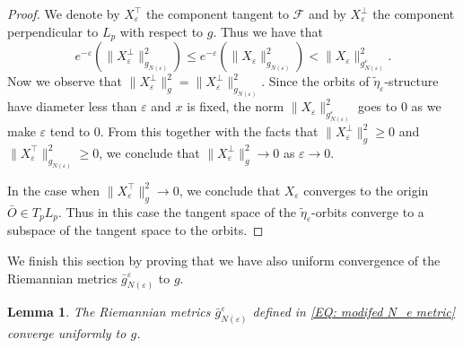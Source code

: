 \documentclass[12pt,a4paper,reqno]{amsart}
\newtheorem{lemma}[theorem]{Lemma}
\theoremstyle{definition}
\numberwithin{equation}{section}
\newcommand{\fol}{\mathcal{F}}
\begin{document}
\begin{proof}
We denote by $X_\varepsilon^\top$ the component tangent to $\fol$ and by $X_\varepsilon^\perp$  the component perpendicular to $L_p$ with respect to $g$. Thus we have that 
\[
e^{-\varepsilon}(\|X_\varepsilon^\perp\|^2_{g_{N(\varepsilon)}})\leq e^{-\varepsilon}(\|X_\varepsilon\|^2_{g_{N(\varepsilon)}}) < \|X_\varepsilon\|^2_{g^\varepsilon_{N(\varepsilon)}}.
\]
Now we observe that $\|X_\varepsilon^\perp\|^2_g = \|X_\varepsilon^\perp\|^2_{g_{N(\varepsilon)}}$. Since the orbits of $\widetilde{\eta}_\varepsilon$-structure have diameter less than $\varepsilon$ and $x$ is fixed, the norm $\|X_\varepsilon\|^2_{g^\varepsilon_{N(\varepsilon)}}$ goes to $0$ as we make $\varepsilon$ tend to $0$. From this together with the facts that $\|X_\varepsilon^\perp\|^2_g\geq 0$ and $\|X_\varepsilon^\top\|^2_{g_{N(\varepsilon)}}\geq 0$, we conclude that $\|X_\varepsilon^\perp\|^2_{g}\to 0$ as $\varepsilon\to 0$.

In the case when $\|X_\varepsilon^\top\|^2_{g}\to 0$, we conclude that $X_\varepsilon$ converges to the origin $\bar{O}\in T_p L_p$. Thus  in this case the tangent space of the $\widetilde{\eta}_\varepsilon$-orbits converge to a subspace of the tangent space to the orbits.
\end{proof}

We finish this section by proving that we have also uniform convergence of the Riemannian metrics $\bar{g}^\varepsilon_{N(\varepsilon)}$ to $g$.

\begin{lemma}\th\label{L: uniform convergence of bar g to g }
The Riemannian metrics $\bar{g}^\varepsilon_{N(\varepsilon)}$ defined in \eqref{EQ: modifed N_e metric} converge uniformly to $g$. 
\end{lemma}
\end{document}
